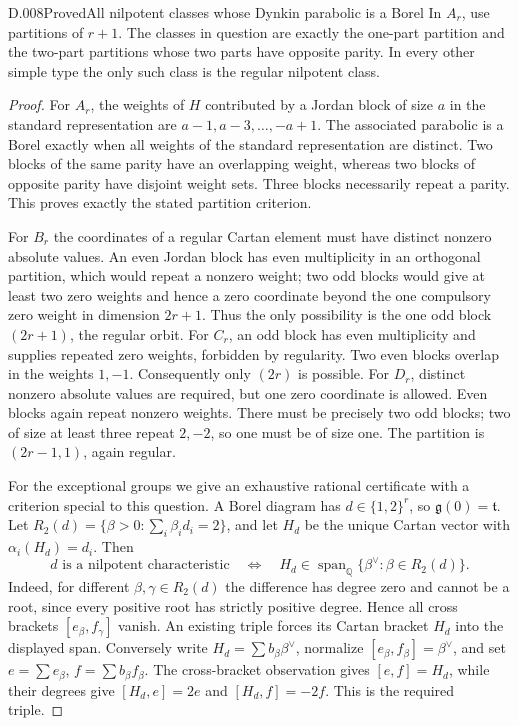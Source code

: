 \begin{saresult}{D.008}{Proved}{All nilpotent classes whose Dynkin parabolic is a Borel}
In $A_r$, use partitions of $r+1$.  The classes in question are exactly
the one-part partition and the two-part partitions whose two parts
have opposite parity.  In every other simple type the only such
class is the regular nilpotent class.
\end{saresult}
\begin{proof}
For $A_r$, the weights of $H$ contributed by a Jordan block of size
$a$ in the standard representation are
$a-1,a-3,\ldots,-a+1$.  The associated parabolic is a Borel exactly
when all weights of the standard representation are distinct.
Two blocks of the same parity have an overlapping weight, whereas
two blocks of opposite parity have disjoint weight sets.  Three
blocks necessarily repeat a parity.  This proves exactly the stated
partition criterion.

For $B_r$ the coordinates of a regular Cartan element must have
distinct nonzero absolute values.  An even Jordan block has even
multiplicity in an orthogonal partition, which would repeat a
nonzero weight; two odd blocks would give at least two zero weights
and hence a zero coordinate beyond the one compulsory zero weight
in dimension $2r+1$.  Thus the only possibility is the one odd block
$(2r+1)$, the regular orbit.  For $C_r$, an odd block has even
multiplicity and supplies repeated zero weights, forbidden by
regularity.  Two even blocks overlap in the weights $1,-1$.
Consequently only $(2r)$ is possible.  For $D_r$, distinct nonzero
absolute values are required, but one zero coordinate is allowed.
Even blocks again repeat nonzero weights.  There must be precisely
two odd blocks; two of size at least three repeat $2,-2$, so one
must be of size one.  The partition is $(2r-1,1)$, again regular.

For the exceptional groups we give an exhaustive rational certificate
with a criterion special to this question.  A Borel diagram has
$d\in\{1,2\}^r$, so $\mathfrak g(0)=\mathfrak t$.  Let
$R_2(d)=\{\beta>0:\sum_i\beta_i d_i=2\}$, and let $H_d$ be the
unique Cartan vector with $\alpha_i(H_d)=d_i$.  Then
\[
 d\text{ is a nilpotent characteristic}
 \quad\Longleftrightarrow\quad
 H_d\in\operatorname{span}_{\mathbb Q}
          \{\beta^\vee:\beta\in R_2(d)\}.                 \tag{D.8.1}
\]
Indeed, for different $\beta,\gamma\in R_2(d)$ the difference has
degree zero and cannot be a root, since every positive root has
strictly positive degree.  Hence all cross brackets
$[e_\beta,f_\gamma]$ vanish.  An existing triple forces its Cartan
bracket $H_d$ into the displayed span.  Conversely write
$H_d=\sum b_\beta\beta^\vee$, normalize
$[e_\beta,f_\beta]=\beta^\vee$, and set
$e=\sum e_\beta$, $f=\sum b_\beta f_\beta$.
The cross-bracket observation gives $[e,f]=H_d$, while their degrees
give $[H_d,e]=2e$ and $[H_d,f]=-2f$.  This is the required triple.


\end{proof}
